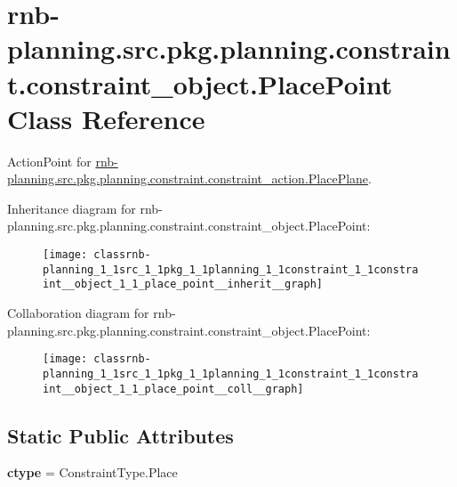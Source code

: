 \hypertarget{classrnb-planning_1_1src_1_1pkg_1_1planning_1_1constraint_1_1constraint__object_1_1_place_point}{}\section{rnb-\/planning.src.\+pkg.\+planning.\+constraint.\+constraint\+\_\+object.\+Place\+Point Class Reference}
\label{classrnb-planning_1_1src_1_1pkg_1_1planning_1_1constraint_1_1constraint__object_1_1_place_point}


Action\+Point for \hyperlink{classrnb-planning_1_1src_1_1pkg_1_1planning_1_1constraint_1_1constraint__action_1_1_place_plane}{rnb-\/planning.\+src.\+pkg.\+planning.\+constraint.\+constraint\+\_\+action.\+Place\+Plane}.  




Inheritance diagram for rnb-\/planning.src.\+pkg.\+planning.\+constraint.\+constraint\+\_\+object.\+Place\+Point\+:
\nopagebreak
\begin{figure}[H]
\begin{center}
\leavevmode
\texttt{[image: classrnb-planning\_1\_1src\_1\_1pkg\_1\_1planning\_1\_1constraint\_1\_1constraint\_\_object\_1\_1\_place\_point\_\_inherit\_\_graph]}
\end{center}
\end{figure}


Collaboration diagram for rnb-\/planning.src.\+pkg.\+planning.\+constraint.\+constraint\+\_\+object.\+Place\+Point\+:
\nopagebreak
\begin{figure}[H]
\begin{center}
\leavevmode
\texttt{[image: classrnb-planning\_1\_1src\_1\_1pkg\_1\_1planning\_1\_1constraint\_1\_1constraint\_\_object\_1\_1\_place\_point\_\_coll\_\_graph]}
\end{center}
\end{figure}
\subsection*{Static Public Attributes}
\begin{DoxyCompactItemize}
\item 
\mbox{\label{classrnb-planning_1_1src_1_1pkg_1_1planning_1_1constraint_1_1constraint__object_1_1_place_point_a414eed0343ffb1436896c236424b7b55}} 
{\bfseries ctype} = Constraint\+Type.\+Place
\end{DoxyCompactItemize}

